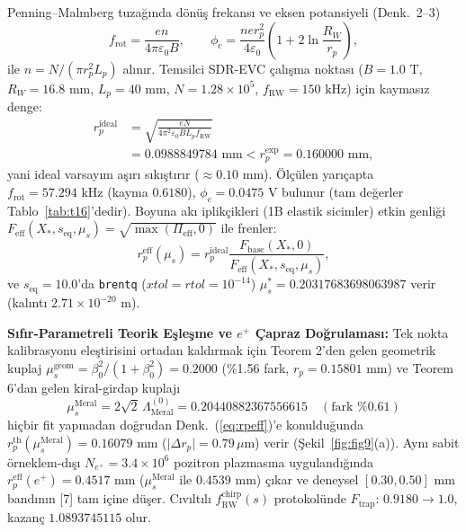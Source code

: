 \documentclass[12pt,a4paper]{article}
\begin{document}
Penning--Malmberg tuzağında dönüş frekansı ve eksen potansiyeli (Denk.\ 2--3)
\begin{equation}
f_{\mathrm{rot}} = \frac{en}{4\pi\varepsilon_0 B}, \qquad
\phi_c = \frac{ner_p^2}{4\varepsilon_0}\left(1 + 2\ln\frac{R_W}{r_p}\right),
\label{eq:trapbase}
\end{equation}
ile $n = N/(\pi r_p^2 L_p)$ alınır. Temsilci SDR-EVC çalışma noktası ($B=1.0\text{ T}$, $R_W=16.8\text{ mm}$, $L_p=40\text{ mm}$, $N=1.28\times10^5$, $f_{\mathrm{RW}}=150\text{ kHz}$) için kaymasız denge:
\begin{equation}
\begin{split}
r_p^{\mathrm{ideal}} &= \sqrt{\frac{eN}{4\pi^2\varepsilon_0 B L_p f_{\mathrm{RW}}}} \\
&= 0.0988849784\text{ mm} < r_p^{\mathrm{exp}} = 0.160000\text{ mm},
\end{split}
\label{eq:rpideal}
\end{equation}
yani ideal varsayım aşırı sıkıştırır ($\approx 0.10\text{ mm}$). Ölçülen yarıçapta $f_{\mathrm{rot}} = 57.294\text{ kHz}$ (kayma $0.6180$), $\phi_c = 0.0475\text{ V}$ bulunur (tam değerler Tablo~\ref{tab:t16}'dedir). Boyuna akı iplikçikleri (1B elastik sicimler) etkin genliği $F_{\mathrm{eff}}(X_*,s_{\mathrm{eq}},\mu_s) = \sqrt{\max(\Pi_{\mathrm{eff}},0)}$ ile frenler:
\begin{equation}
r_p^{\mathrm{eff}}(\mu_s) = r_p^{\mathrm{ideal}} \frac{F_{\mathrm{base}}(X_*,0)}{F_{\mathrm{eff}}(X_*,s_{\mathrm{eq}},\mu_s)},
\label{eq:rpeff}
\end{equation}
ve $s_{\mathrm{eq}}=10.0$'da \texttt{brentq} ($xtol=rtol=10^{-14}$) $\mu_s^* = 0.20317683698063987$ verir (kalıntı $2.71\times 10^{-20}\text{ m}$).

\textbf{Sıfır-Parametreli Teorik Eşleşme ve $e^+$ Çapraz Doğrulaması:} Tek nokta kalibrasyonu eleştirisini ortadan kaldırmak için Teorem 2'den gelen geometrik kuplaj $\mu_s^{\mathrm{geom}} = \beta_0^2/(1+\beta_0^2) = 0.2000$ (\%1.56 fark, $r_p = 0.15801\text{ mm}$) ve Teorem 6'dan gelen kiral-girdap kuplajı
\begin{equation}
\mu_s^{\mathrm{Meral}} = 2\sqrt{2}\,\Lambda_{\mathrm{Meral}}^{(0)} = 0.20440882367556615 \quad (\text{fark } \%0.61)
\label{eq:mumeral}
\end{equation}
hiçbir fit yapmadan doğrudan Denk.\ (\ref{eq:rpeff})'e konulduğunda $r_p^{\mathrm{th}}(\mu_s^{\mathrm{Meral}}) = 0.16079\text{ mm}$ ($\vert{}\Delta r_p\vert{} = 0.79\,\mu\text{m}$) verir (Şekil~\ref{fig:fig9}(a)). Aynı sabit örneklem-dışı $N_{e^+}=3.4\times 10^6$ pozitron plazmasına uygulandığında $r_p^{\mathrm{eff}}(e^+) = 0.4517\text{ mm}$ ($\mu_s^{\mathrm{Meral}}$ ile $0.4539\text{ mm}$) çıkar ve deneysel $[0.30, 0.50]\text{ mm}$ bandının [7] tam içine düşer. Cıvıltılı $f_{\mathrm{RW}}^{\mathrm{chirp}}(s)$ protokolünde $F_{\mathrm{trap}}$: $0.9180\to1.0$, kazanç $1.0893745115$ olur.
\end{document}
